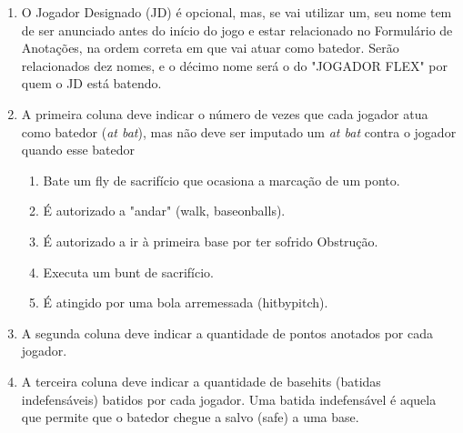		\begin{enumerate}[label=\arabic*)]
			\item O Jogador Designado (JD) é opcional, mas, se vai utilizar um, seu nome tem de ser anunciado antes do início do jogo e estar relacionado no Formulário de Anotações, na ordem correta em que vai atuar como batedor. Serão relacionados dez nomes, e o décimo nome será o do "JOGADOR FLEX"{} por quem o JD está batendo.


			\item A primeira coluna deve indicar o número de vezes que cada jogador atua como batedor (\textit{at bat}), mas não deve ser imputado um \textit{at bat} contra o jogador quando esse batedor

				\begin{enumerate}[label=(\alph*)]
					\item Bate um \gls{fly} de sacrifício que ocasiona a marcação de um ponto.
					\item É autorizado a "andar" (\gls{walk}, \gls{baseonballs}).
					\item É autorizado a ir à primeira base por ter sofrido Obstrução.
					\item Executa um \gls{bunt} de sacrifício.
					\item É atingido por uma bola arremessada (\gls{hitbypitch}).
			\end{enumerate}

			\item A segunda coluna deve indicar a quantidade de pontos anotados por cada jogador.

			\item A terceira coluna deve indicar a quantidade de \glspl{basehit} (batidas indefensáveis) batidos por cada jogador. Uma batida indefensável é aquela que permite que o batedor chegue a salvo (\gls{safe}) a uma base.


\end{enumerate}
